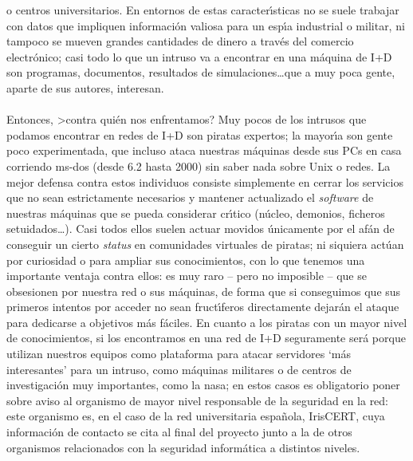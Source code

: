 o centros universitarios. En entornos de estas caracter\'{\i}sticas no se suele
trabajar con datos que impliquen informaci\'on valiosa para un esp\'{\i}a
industrial o militar, ni tampoco se mueven grandes cantidades de dinero a 
trav\'es del comercio electr\'onico; casi todo lo que un intruso va a encontrar
en una m\'aquina de I+D son programas, documentos, resultados de 
simulaciones\ldots que a muy poca gente, aparte de sus autores, interesan.\\
\\Entonces, >contra qui\'en nos enfrentamos? Muy pocos de los intrusos que 
podamos encontrar en redes de I+D son piratas expertos; la mayor\'{\i}a son
gente poco experimentada, que incluso ataca nuestras m\'aquinas desde sus PCs
en casa corriendo {\sc ms-dos} (desde 6.2 hasta 2000) sin saber nada sobre Unix
o redes. La mejor defensa contra estos individuos consiste simplemente en
cerrar los servicios que no sean estrictamente necesarios y mantener actualizado
el {\it software} de nuestras m\'aquinas que se pueda considerar cr\'{\i}tico
(n\'ucleo, demonios, ficheros setuidados\ldots). Casi todos ellos suelen actuar
movidos \'unicamente por el af\'an de conseguir un cierto {\it status} en 
comunidades virtuales de piratas; ni siquiera act\'uan por curiosidad o para 
ampliar sus conocimientos, con lo que tenemos una importante ventaja contra
ellos: es muy raro -- pero no imposible -- que se obsesionen por nuestra red o
sus m\'aquinas, de forma que si conseguimos que sus primeros intentos por
acceder no sean fruct\'{\i}feros directamente dejar\'an el ataque para dedicarse
a objetivos m\'as f\'aciles. En cuanto a los piratas con un mayor nivel de 
conocimientos, si los encontramos en una red de I+D seguramente ser\'a porque
utilizan nuestros equipos como plataforma para atacar servidores `m\'as 
interesantes' para un intruso, como m\'aquinas militares o de centros de
investigaci\'on muy importantes, como la {\sc nasa}; en estos casos es 
obligatorio poner sobre aviso al organismo de mayor nivel responsable de la
seguridad en la red: este organismo es, en el caso de la red universitaria 
espa\~nola, IrisCERT, cuya informaci\'on de contacto se cita al final del
proyecto junto a la de otros organismos relacionados con la seguridad 
inform\'atica a distintos niveles.
